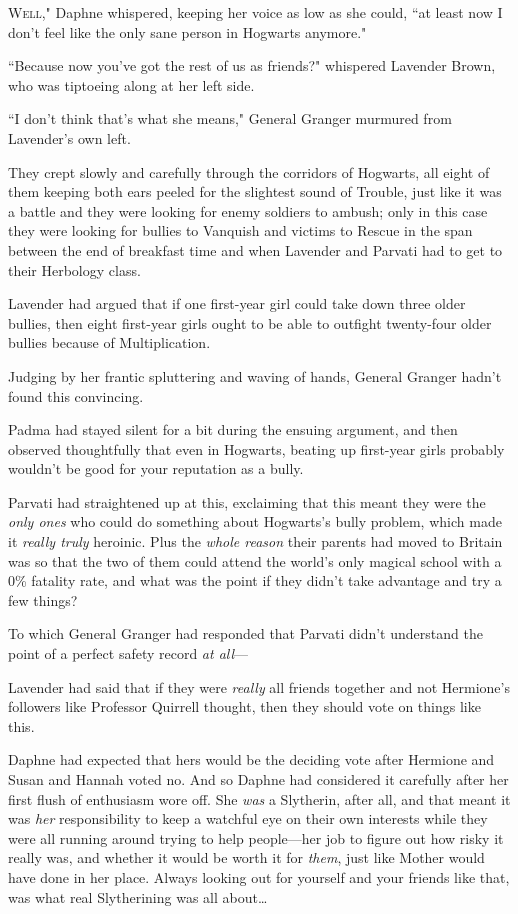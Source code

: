 
\lettrine[ante=``]{W}{ell,"} Daphne whispered, keeping her voice as low as she could, ``at least now I don't feel like the only sane person in Hogwarts anymore."

``Because now you've got the rest of us as friends?" whispered Lavender Brown, who was tiptoeing along at her left side.

``I don't think that's what she means," General Granger murmured from Lavender's own left.

They crept slowly and carefully through the corridors of Hogwarts, all eight of them keeping both ears peeled for the slightest sound of Trouble, just like it was a battle and they were looking for enemy soldiers to ambush; only in this case they were looking for bullies to Vanquish and victims to Rescue in the span between the end of breakfast time and when Lavender and Parvati had to get to their Herbology class.

Lavender had argued that if one first-year girl could take down three older bullies, then eight first-year girls ought to be able to outfight twenty-four older bullies because of Multiplication.

Judging by her frantic spluttering and waving of hands, General Granger hadn't found this convincing.

Padma had stayed silent for a bit during the ensuing argument, and then observed thoughtfully that even in Hogwarts, beating up first-year girls probably wouldn't be good for your reputation as a bully.

Parvati had straightened up at this, exclaiming that this meant they were the \emph{only ones} who could do something about Hogwarts's bully problem, which made it \emph{really truly} heroinic. Plus the \emph{whole reason} their parents had moved to Britain was so that the two of them could attend the world's only magical school with a 0\% fatality rate, and what was the point if they didn't take advantage and try a few things?

To which General Granger had responded that Parvati didn't understand the point of a perfect safety record \emph{at all}—

Lavender had said that if they were \emph{really} all friends together and not Hermione's followers like Professor Quirrell thought, then they should vote on things like this.

Daphne had expected that hers would be the deciding vote after Hermione and Susan and Hannah voted no. And so Daphne had considered it carefully after her first flush of enthusiasm wore off. She \emph{was} a Slytherin, after all, and that meant it was \emph{her} responsibility to keep a watchful eye on their own interests while they were all running around trying to help people—her job to figure out how risky it really was, and whether it would be worth it for \emph{them}, just like Mother would have done in her place. Always looking out for yourself and your friends like that, was what real Slytherining was all about{\ldots}

